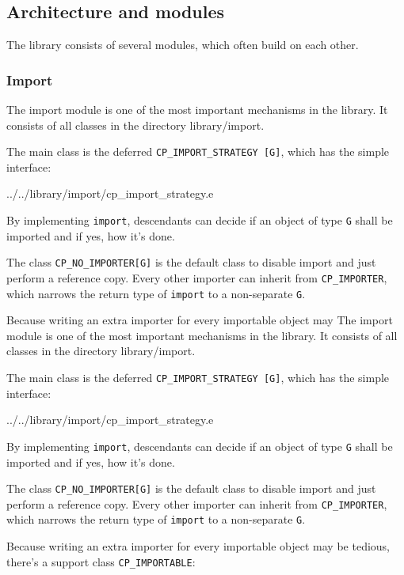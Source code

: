 \documentclass[a4paper,10pt]{report}
\newcommand{\dir} [1] [] {#1}
\begin{document}
\subsection {Architecture and modules}
\label{sec:modules}

The library consists of several modules, which often build on each other.

\subsubsection{Import}
\label{sec:modules:import}

The import module is one of the most important mechanisms in the library.
It consists of all classes in the directory \dir{library/import}.

The main class is the deferred \lstinline!CP_IMPORT_STRATEGY [G]!, which has the simple interface:


 {../../library/import/cp_import_strategy.e}

By implementing \lstinline!import!, descendants can decide if an object of type \lstinline!G! shall be imported and if yes, how it's done.

The class \lstinline!CP_NO_IMPORTER[G]! is the default class to disable import and just perform a reference copy.
Every other importer can inherit from \lstinline!CP_IMPORTER!, which narrows the return type of \lstinline!import! to a non-separate \lstinline!G!.

Because writing an extra importer for every importable object may
The import module is one of the most important mechanisms in the library.
It consists of all classes in the directory \dir{library/import}.

The main class is the deferred \lstinline!CP_IMPORT_STRATEGY [G]!, which has the simple interface:


 {../../library/import/cp_import_strategy.e}

By implementing \lstinline!import!, descendants can decide if an object of type \lstinline!G! shall be imported and if yes, how it's done.

The class \lstinline!CP_NO_IMPORTER[G]! is the default class to disable import and just perform a reference copy.
Every other importer can inherit from \lstinline!CP_IMPORTER!, which narrows the return type of \lstinline!import! to a non-separate \lstinline!G!.

Because writing an extra importer for every importable object may be tedious, there's a support class \lstinline!CP_IMPORTABLE!:
\end{document}
